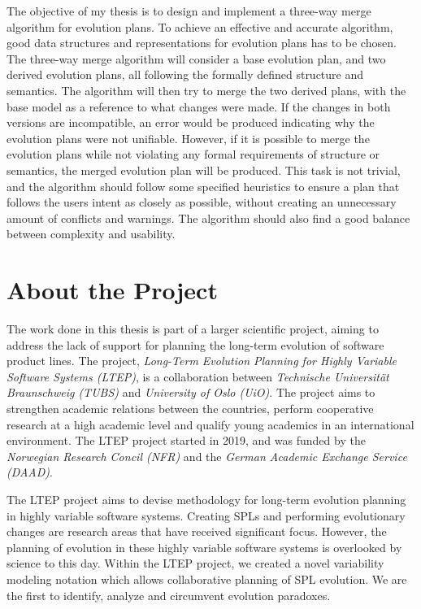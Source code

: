 \documentclass[a4paper,english]{ifimaster}
\begin{document}
The objective of my thesis is to design and implement a three-way merge algorithm for evolution plans. To achieve an effective and accurate algorithm, good data structures and representations for evolution plans has to be chosen. The three-way merge algorithm will consider a base evolution plan, and two derived evolution plans, all following the formally defined structure and semantics. The algorithm will then try to merge the two derived plans, with the base model as a reference to what changes were made. If the changes in both versions are incompatible, an error would be produced indicating why the evolution plans were not unifiable. However, if it is possible to merge the evolution plans while not violating any formal requirements of structure or semantics, the merged evolution plan will be produced.  This task is not trivial, and the algorithm should follow some specified heuristics to ensure a plan that follows the users intent as closely as possible, without creating an unnecessary amount of conflicts and warnings. The algorithm should also find a good balance between complexity and usability.

\section{About the Project}%
\label{sec:about_the_project}

The work done in this thesis is part of a larger scientific project, aiming to address the lack of support for planning the long-term evolution of software product lines. The project, \textit{Long-Term Evolution Planning for Highly Variable Software Systems (LTEP)}, is a collaboration between \textit{Technische Universität Braunschweig (TUBS)} and \textit{University of Oslo (UiO)}. The project aims to strengthen academic relations between the countries, perform cooperative research at a high academic level and  qualify young academics in an international environment. The LTEP project started in 2019, and was funded by the \textit{Norwegian Research Concil (NFR)} and the \textit{German Academic Exchange Service (DAAD)}.

The LTEP project aims to devise methodology for long-term evolution planning in highly variable software systems. Creating SPLs and performing evolutionary changes are research areas that have received significant focus. However, the planning of evolution in these highly variable software systems is overlooked by science to this day.  Within the LTEP project, we created a novel variability modeling notation which allows collaborative planning of SPL evolution. We are the first to identify, analyze and circumvent evolution paradoxes.
\end{document}
